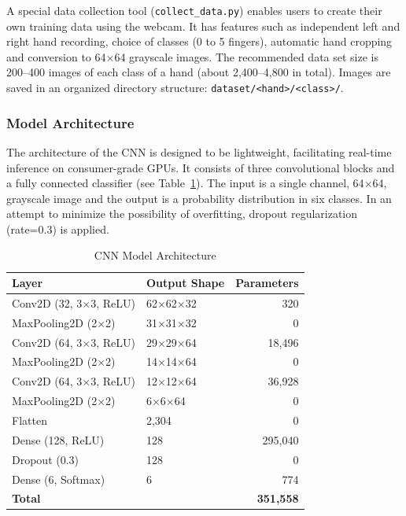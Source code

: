 \documentclass[conference]{IEEEtran}
\begin{document}
A special data collection tool (\texttt{collect\_data.py}) enables users to create their own training data using the webcam. It has features such as independent left and right hand recording, choice of classes (0 to 5 fingers), automatic hand cropping and conversion to 64$\times$64 grayscale images. The recommended data set size is 200--400 images of each class of a hand (about 2,400--4,800 in total). Images are saved in an organized directory structure: \texttt{dataset/<hand>/<class>/}.

\subsubsection{Model Architecture}

The architecture of the CNN is designed to be lightweight, facilitating real-time inference on consumer-grade GPUs. It consists of three convolutional blocks and a fully connected classifier (see Table~\ref{tab:model}). The input is a single channel, 64$\times$64, grayscale image and the output is a probability distribution in six classes. In an attempt to minimize the possibility of overfitting, dropout regularization (rate=0.3) is applied.

\begin{table}[htbp]
\caption{CNN Model Architecture}
\label{tab:model}
\centering
\begin{tabular}{llr}
\toprule
\textbf{Layer} & \textbf{Output Shape} & \textbf{Parameters} \\
\midrule
Conv2D (32, 3$\times$3, ReLU) & 62$\times$62$\times$32 & 320 \\
MaxPooling2D (2$\times$2) & 31$\times$31$\times$32 & 0 \\
Conv2D (64, 3$\times$3, ReLU) & 29$\times$29$\times$64 & 18,496 \\
MaxPooling2D (2$\times$2) & 14$\times$14$\times$64 & 0 \\
Conv2D (64, 3$\times$3, ReLU) & 12$\times$12$\times$64 & 36,928 \\
MaxPooling2D (2$\times$2) & 6$\times$6$\times$64 & 0 \\
Flatten & 2,304 & 0 \\
Dense (128, ReLU) & 128 & 295,040 \\
Dropout (0.3) & 128 & 0 \\
Dense (6, Softmax) & 6 & 774 \\
\midrule
\textbf{Total} & & \textbf{351,558} \\
\bottomrule
\end{tabular}
\end{table}
\end{document}
